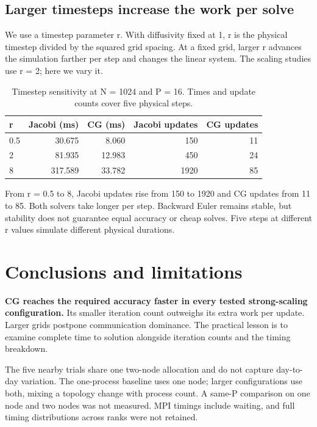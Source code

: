 \documentclass[11pt]{article}
\begin{document}
\clearpage

\subsection{Larger timesteps increase the work per solve}

We use a timestep parameter r. With diffusivity fixed at 1, r is the physical timestep divided by the squared grid spacing. At a fixed grid, larger r advances the simulation farther per step and changes the linear system. The scaling studies use r = 2; here we vary it.

\begin{table}[H]
\centering\small
\begin{tabular}{lrrrr}
\toprule
r & Jacobi (ms) & CG (ms) & Jacobi updates & CG updates \\
\midrule
0.5 & 30.675 & 8.060 & 150 & 11 \\
2 & 81.935 & 12.983 & 450 & 24 \\
8 & 317.589 & 33.782 & 1920 & 85 \\
\bottomrule
\end{tabular}
\caption{Timestep sensitivity at N = 1024 and P = 16. Times and update counts cover five physical steps.}
\end{table}

From r = 0.5 to 8, Jacobi updates rise from 150 to 1920 and CG updates from 11 to 85. Both solvers take longer per step. Backward Euler remains stable, but stability does not guarantee equal accuracy or cheap solves. Five steps at different r values simulate different physical durations.

\section{Conclusions and limitations}

\textbf{CG reaches the required accuracy faster in every tested strong-scaling configuration.} Its smaller iteration count outweighs its extra work per update. Larger grids postpone communication dominance. The practical lesson is to examine complete time to solution alongside iteration counts and the timing breakdown.

The five nearby trials share one two-node allocation and do not capture day-to-day variation. The one-process baseline uses one node; larger configurations use both, mixing a topology change with process count. A same-P comparison on one node and two nodes was not measured. MPI timings include waiting, and full timing distributions across ranks were not retained.
\end{document}
